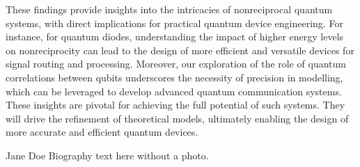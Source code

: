 \documentclass[lettersize,journal]{IEEEtran}
\begin{document}
These findings provide insights into the intricacies of nonreciprocal quantum systems, with direct implications for practical quantum device engineering. 
For instance, for quantum diodes, understanding the impact of higher energy levels on nonreciprocity can lead to the design of more efficient and versatile devices for signal routing and processing. 
Moreover, our exploration of the role of quantum correlations between qubits underscores the necessity of precision in modelling, which can be leveraged to develop advanced quantum communication systems. 
These insights are pivotal for achieving the full potential of such systems. They will drive the refinement of theoretical models, ultimately enabling the design of more accurate and efficient quantum devices. 




\begin{IEEEbiographynophoto}{Jane Doe}
Biography text here without a photo.
\end{IEEEbiographynophoto}

\end{document}
